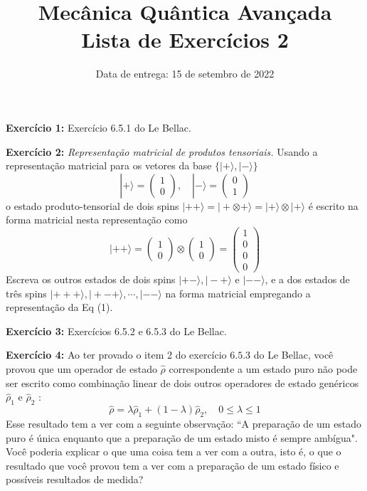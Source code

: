 \documentclass[12pt]{article}
\title{Mecânica Quântica Avançada\\Lista de Exercícios 2}
\date{Data de entrega: 15 de setembro de 2022}
\begin{document}
\maketitle

\textbf{Exercício 1:} Exercício 6.5.1 do Le Bellac.

\textbf{Exercício 2:} \emph{Representação matricial de produtos tensoriais.} Usando a representação matricial para os vetores da base \(\{|+\rangle,|-\rangle\}\)
\begin{equation}
|+\rangle=\left(\begin{array}{l}1 \\ 0\end{array}\right), \quad|-\rangle=\left(\begin{array}{l}0 \\ 1\end{array}\right)
\end{equation}
o estado produto-tensorial de dois spins \(|++\rangle=|+\otimes+\rangle=|+\rangle \otimes|+\rangle\) é escrito na forma matricial
nesta representação como
\[
|++\rangle=\left(\begin{array}{l}1 \\ 0\end{array}\right) \otimes\left(\begin{array}{l}1 \\ 0\end{array}\right)=\left(\begin{array}{l}1 \\ 0 \\ 0 \\ 0\end{array}\right)
\]
Escreva os outros estados de dois spins \(|+-\rangle,|-+\rangle\) e \(|--\rangle\), e a dos estados de três spins
\(|+++\rangle,|+-+\rangle, \cdots,|--\rangle\) na forma matricial empregando a representação da Eq (1).

\textbf{Exercício 3:} Exercícios 6.5.2 e 6.5.3 do Le Bellac.

\textbf{Exercício 4:} Ao ter provado o item 2 do exercício \(6.5.3\) do Le Bellac, você provou que um operador de
estado \(\hat{\rho}\) correspondente a um estado puro não pode ser escrito como combinação linear de
dois outros operadores de estado genéricos \(\hat{\rho}_{1}\) e \(\hat{\rho}_{2}\) :
\[
\hat{\rho}=\lambda \hat{\rho}_{1}+(1-\lambda) \hat{\rho}_{2}, \quad 0 \leq \lambda \leq 1
\]
Esse resultado tem a ver com a seguinte observação: ``A preparação de um estado puro é única enquanto que a preparação de um estado misto é sempre ambígua". Você poderia explicar o que uma coisa tem a ver com a outra, isto é, o que o resultado que você provou tem a ver com a preparação de um estado físico e possíveis resultados de medida?
\end{document}
